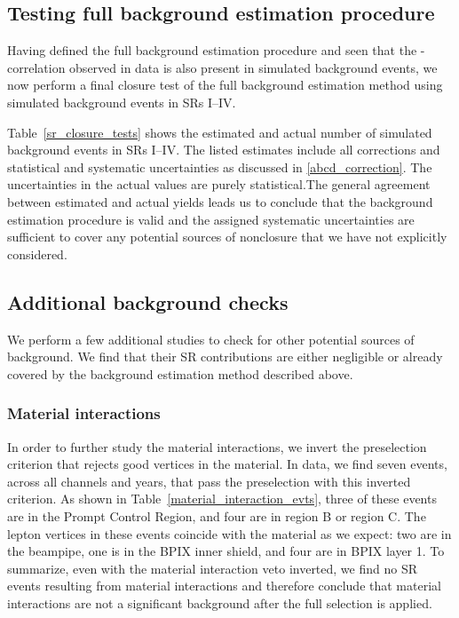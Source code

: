 

\subsection{Testing full background estimation procedure}

Having defined the full background estimation procedure and seen that the \ada-\adb correlation observed in data is also present in simulated background events, we now perform a final closure test of the full background estimation method using simulated background events in SRs I--IV.

Table~\ref{sr_closure_tests} shows the estimated and actual number of simulated background events in SRs I--IV. The listed estimates include all corrections and statistical and systematic uncertainties as discussed in \ref{abcd_correction}. The uncertainties in the actual values are purely statistical.The general agreement between estimated and actual yields leads us to conclude that the background estimation procedure is valid and the assigned systematic uncertainties are sufficient to cover any potential sources of nonclosure that we have not explicitly considered.



\subsection{Additional background checks}
\label{additional_bg_checks}
We perform a few additional studies to check for other potential sources of background. We find that their SR contributions are either negligible or already covered by the background estimation method described above.

\subsubsection{Material interactions}
In order to further study the material interactions, we invert the preselection criterion that rejects good vertices in the material. In data, we find seven events, across all channels and years, that pass the preselection with this inverted criterion. As shown in Table~\ref{material_interaction_evts}, three of these events are in the Prompt Control Region, and four are in region B or region C. The lepton vertices in these events coincide with the material as we expect: two are in the beampipe, one is in the BPIX inner shield, and four are in BPIX layer 1. To summarize, even with  the material interaction veto inverted, we find no SR events resulting from material interactions and therefore conclude that material interactions are not a significant background after the full selection is applied.

